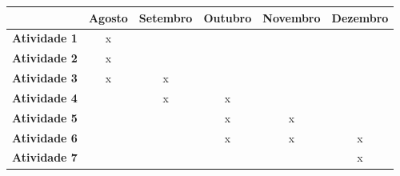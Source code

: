 \begin{table}[h]
\centering
\begin{tabular}{c|c|c|c|c|c|}
\cline{2-6}
\multicolumn{1}{l|}{} & \textbf{Agosto} & \textbf{Setembro} & \textbf{Outubro} & \textbf{Novembro} & \textbf{Dezembro} \\ \hline
\multicolumn{1}{|c|}{\textbf{Atividade 1}} & x &   &   &   &   \\ \hline
\multicolumn{1}{|c|}{\textbf{Atividade 2}} & x &   &   &   &   \\ \hline
\multicolumn{1}{|c|}{\textbf{Atividade 3}} & x & x &   &   &   \\ \hline
\multicolumn{1}{|c|}{\textbf{Atividade 4}} &   & x & x &   &   \\ \hline
\multicolumn{1}{|c|}{\textbf{Atividade 5}} &   &   & x & x &   \\ \hline
\multicolumn{1}{|c|}{\textbf{Atividade 6}} &   &   & x & x & x \\ \hline
\multicolumn{1}{|c|}{\textbf{Atividade 7}} &   &   &   &   & x \\ \hline
\end{tabular}
\end{table}
